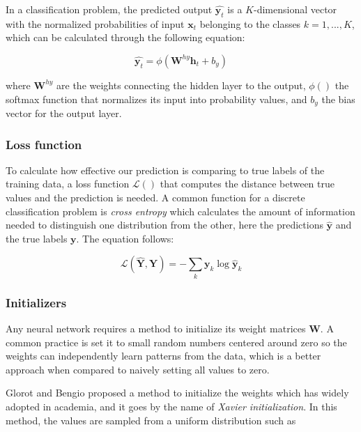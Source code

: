 \documentclass{kththesis}
\begin{document}
In a classification problem, the predicted output $\hat{\mathbf{y}_t}$ is a $K$-dimensional vector with the normalized probabilities of input $\mathbf{x}_t$ belonging to the classes $k=1,...,K$, which can be calculated through the following equation:

\begin{equation}
\hat{\mathbf{y}_t} = \phi(\mathbf{W}^{hy}\mathbf{h}_t + b_y)
\end{equation}

where $\mathbf{W}^{hy}$ are the weights connecting the hidden layer to the output, $\phi()$ the softmax function that normalizes its input into probability values, and $b_y$ the bias vector for the output layer. 

\subsubsection{Loss function}

To calculate how effective our prediction is comparing to true labels of the training data, a loss function $\mathcal{L}()$ that computes the distance between true values and the prediction is needed. A common function for a discrete classification problem is \emph{cross entropy} which calculates the amount of information needed to distinguish one distribution from the other, here the predictions $\hat{\mathbf{y}}$ and the true labels $\mathbf{y}$. The equation follows:

\begin{equation}
\mathcal{L}(\hat{\mathbf{Y}}, \mathbf{Y}) = - \sum_k \mathbf{y}_k \log \hat{\mathbf{y}}_k
\end{equation}

\subsubsection{Initializers}

Any neural network requires a method to initialize its weight matrices $\mathbf{W}$. A common practice is set it to small random numbers centered around zero so the weights can independently learn patterns from the data, which is a better approach when compared to naively setting all values to zero. 

Glorot and Bengio\citep{glorot2010understanding} proposed a method to initialize the weights which has widely adopted in academia, and it goes by the name of \emph{Xavier initialization}. In this method, the values are sampled from a uniform distribution such as
\end{document}
